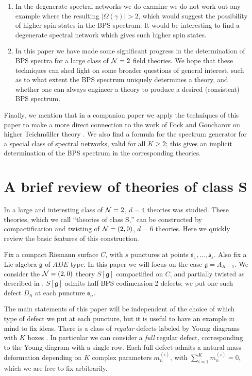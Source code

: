 \documentclass[11pt,a4paper]{article}
\def\fg{\mathfrak{g}}
\def\CN{{\cal N}}
\def\CN {{\cal N}}
\newcommand{\abs}[1]{\lvert#1\rvert}
\newcommand{\ti}[1]{\textit{#1}}
\def\fg{\mathfrak{g}}
\def\fs{\mathfrak{s}}
\def\CN{{\cal N}}
\def\CN {{\cal N}}
\newcommand\N{{\cal N}}
\begin{document}
\begin{enumerate}
\item In the degenerate spectral networks we do examine we do not
work out any example where the resulting $\abs{\Omega(\gamma)} > 2$, which would suggest
the possibility of higher spin states in the BPS spectrum.  It would be interesting to find
a degenerate spectral network which gives such higher spin states.

\item In this paper we have made some
significant progress in the determination of BPS spectra for a large class of $\N=2$
field theories. We hope that these techniques can shed light on some broader
questions of general interest, such as to what extent the BPS spectrum uniquely
determines a theory, and whether one can always engineer a theory to produce
a desired (consistent) BPS spectrum.

\end{enumerate}

Finally, we mention that in a companion paper \cite{gmn6-to-appear} we
apply the techniques of this paper to make a more direct connection to the
work of Fock and Goncharov on higher Teichm\"uller theory \cite{MR2233852}.
We also find a formula for the spectrum generator for a special class of spectral networks,
valid for all $K \geq 2$; this gives an implicit determination of the BPS spectrum
in the corresponding theories.


\section{A brief review of theories of class S} \label{sec:review-S}

In \cite{Witten:1997sc, Gaiotto:2009we, Gaiotto:2009hg} a large and interesting
class of $\CN=2$, $d=4$ theories was studied.
These theories, which we call ``theories of class S,''
can be constructed by compactification and twisting of
$\CN=(2,0)$, $d=6$ theories.
Here we quickly review the basic features of this construction.

Fix a compact Riemann surface $C$, with $s$ punctures at points $\fs_1, \dots, \fs_s$.  Also fix a Lie algebra
$\fg$ of $ADE$ type.  In this paper we will focus on the case $\fg = A_{K-1}$.
We consider the $\CN=(2,0)$ theory $S[\fg]$ compactified on $C$, and partially twisted as described in \cite{Gaiotto:2009hg}.  $S[\fg]$ admits half-BPS codimension-2 defects; we put one
such defect $D_n$ at each puncture $\fs_n$.

The main statements of this paper will be independent of the choice of which type of defect
we put at each puncture, but it is useful to have an example in mind to fix ideas.
There is a class of \ti{regular} defects labeled by Young diagrams with
$K$ boxes \cite{Gaiotto:2009we, Gaiotto:2009hg}.
In particular we can consider a \ti{full} regular defect,
corresponding to the Young diagram with a single row.
Each full defect admits a natural mass deformation depending
on $K$ complex parameters $m_n^{(i)}$, with
$\sum_{i=1}^K m_n^{(i)} = 0$, which we are free to fix arbitrarily.
\end{document}
